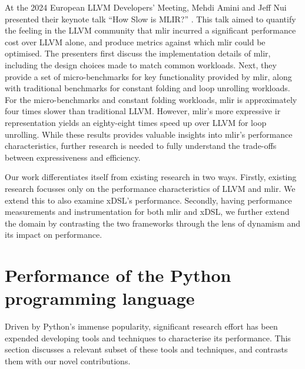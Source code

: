At the 2024 European LLVM Developers' Meeting, Mehdi Amini and Jeff Nui presented their keynote talk ``How Slow is MLIR?'' \cite{aminiHowSlowMLIR2024}.
This talk aimed to quantify the feeling in the LLVM community that \ac{mlir} incurred a significant performance cost over LLVM alone, and produce metrics against which \ac{mlir} could be optimised.
The presenters first discuss the implementation details of \ac{mlir}, including the design choices made to match common workloads.
Next, they provide a set of micro-benchmarks for key functionality provided by \ac{mlir}, along with traditional benchmarks for constant folding and loop unrolling workloads. For the micro-benchmarks and constant folding workloads, \ac{mlir} is approximately four times slower than traditional LLVM. However, \ac{mlir}'s more expressive \ac{ir} representation yields an eighty-eight times speed up over LLVM for loop unrolling.
While these results provides valuable insights into \ac{mlir}'s performance characteristics, further research is needed to fully understand the trade-offs between expressiveness and efficiency.


Our work differentiates itself from existing research in two ways.
Firstly, existing research focusses only on the performance characteristics of LLVM and \ac{mlir}. We extend this to also examine xDSL's performance.
Secondly, having performance measurements and instrumentation for both \ac{mlir} and xDSL, we further extend the domain by contrasting the two frameworks through the lens of dynamism and its impact on performance.






\section{Performance of the Python programming language}
\label{sec:python-performance}

Driven by Python's immense popularity, significant research effort has been expended developing tools and techniques to characterise its performance.
This section discusses a relevant subset of these tools and techniques, and contrasts them with our novel contributions.



